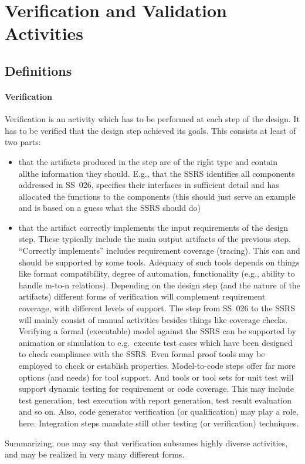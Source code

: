 \documentclass{template/openetcs_article}
\begin{document}


\section{Verification and Validation Activities}
\subsection{Definitions}

\paragraph{Verification}

Verification is an activity which has to be performed at each step of
the design. It has to be verified that the design step achieved its
goals. This consists at least of two parts:
\begin{itemize}
\item that the artifacts produced in the step are of the right type
  and contain allthe information they should. E.g., that the SSRS
  identifies all components addressed in SS~026, specifies their
  interfaces in sufficient detail and has allocated the functions to
  the components (this should just serve an example and is based on a
  guess what the SSRS should do)
\item that the artifact correctly implements the input requirements of
  the design step. These typically include the main output artifacts
  of the previous step. ``Correctly implements'' includes requirement
  coverage (tracing). This can and should be supported by some
  tools. Adequacy of such tools depends on things like format
  compatibility, degree of automation, functionality (e.g., ability to
  handle m-to-n relations). Depending on the design step (and the
  nature of the artifacts) different forms of verification will
  complement requirement coverage, with different levels of
  support. The step from SS~026 to the SSRS will mainly consist of
  manual activities besides things like coverage checks. Verifying a
  formal (executable) model against the SSRS can be supported by
  animation or simulation to e.g.\ execute test cases which have been
  designed to check compliance with the SSRS. Even formal proof tools
  may be employed to check or establish properties. Model-to-code steps
  offer far more options (and needs) for tool support. And tools or
  tool sets for unit test will support dynamic testing for requirement
  or code coverage. This may include test generation, test execution
  with report generation, test result evaluation and so on. Also, code
  generator verification (or qualification) may play a role,
  here. Integration steps mandate still other testing (or
  verification) techniques.
\end{itemize}
Summarizing, one may say that verification subsumes highly diverse
activities, and may be realized in very many different forms.
\end{document}
